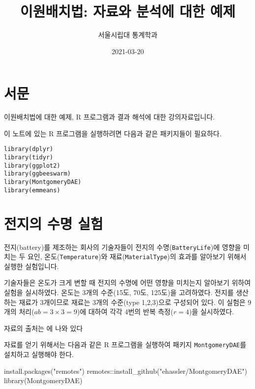 \documentclass[
]{book}
\title{이원배치법: 자료와 분석에 대한 예제}
\author{서울시립대 통계학과}
\date{2021-03-20}
\newenvironment{Shaded}{\begin{snugshade}}{\end{snugshade}}
\newcommand{\FunctionTok}[1]{\textcolor[rgb]{0.00,0.00,0.00}{#1}}
\newcommand{\NormalTok}[1]{#1}
\newcommand{\SpecialCharTok}[1]{\textcolor[rgb]{0.00,0.00,0.00}{#1}}
\newcommand{\StringTok}[1]{\textcolor[rgb]{0.31,0.60,0.02}{#1}}
\begin{document}
\maketitle

{
\setcounter{tocdepth}{1}
\tableofcontents
}
\hypertarget{uxc11cuxbb38}{%
\chapter*{서문}\label{uxc11cuxbb38}}


이원배치법에 대한 예제, R 프로그램과 결과 해석에 대한 강의자료입니다.

이 노트에 있는 R 프로그램을 실행하려면 다음과 같은 패키지들이 필요하다.

\begin{verbatim}
library(dplyr)
library(tidyr)
library(ggplot2)
library(ggbeeswarm)
library(MontgomeryDAE)
library(emmeans)
\end{verbatim}

\mainmatter

\hypertarget{battery}{%
\chapter{전지의 수명 실험}\label{battery}}

전지(battery)를 제조하는 회사의 기술자들이 전지의 수명(\texttt{BatteryLife})에 영향을 미치는 두 요인, 온도(\texttt{Temperature})와 재료(\texttt{MaterialType})의 효과를 알아보기 위해서 실행한 실험입니다.

기술자들은 온도가 크게 변할 때 전지의 수명에 어떤 영향을 미치는지 알아보기 위하여 실험을 실시하였다. 온도는 3개의 수준(15도, 70도, 125도)을 고려하였다. 전지를 생산하는 재료가 3개이므로 재료는 3개의 수준(type 1,2,3)으로 구성되어 있다. 이 실험은 9 개의 처리(\(ab=3\times 3=9\))에 대하여 각각 4번의 반복 측정(\(r=4\))을 실시하였다.

자료의 출처는 \citep{montgomery2017design} 에 나와 있다

자료를 얻기 위해서는 다음과 같은 R 프로그램을 실행하여 패키지 \texttt{MontgomeryDAE}를 설치하고 실행해야 한다.

\begin{Shaded}
\begin{Highlighting}[]
\FunctionTok{install.packages}\NormalTok{(}\StringTok{"remotes"}\NormalTok{)}
\NormalTok{remotes}\SpecialCharTok{::}\FunctionTok{install\_github}\NormalTok{(}\StringTok{"ehassler/MontgomeryDAE"}\NormalTok{)}
\FunctionTok{library}\NormalTok{(MontgomeryDAE)}
\end{Highlighting}
\end{Shaded}
\end{document}

